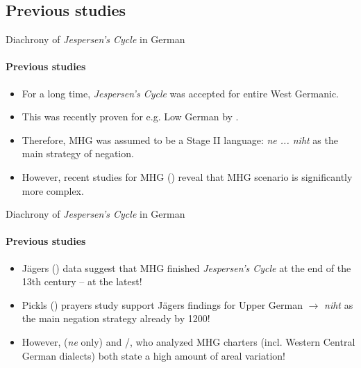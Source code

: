 \documentclass[xcolor=table, compress, %
handout
]{beamer}
\begin{document}
\subsection{Previous studies}
\begin{frame}{Diachrony of \textit{Jespersen's Cycle} in German}
\framesubtitle{Previous studies}

\begin{itemize}
    \item For a long time, \textit{Jespersen's Cycle} was accepted for entire West Germanic.
    \item This was recently proven for e.g. Low German by \citet{Breitbarth2014}.
    \item Therefore, MHG was assumed to be a Stage II language: \textit{ne ... niht} as the main strategy of negation.
    \item However, recent studies for MHG (\citealt{jaeger08,Pickl2017}) reveal that MHG scenario is significantly more complex.
\end{itemize}

\end{frame}

\begin{frame}{Diachrony of \textit{Jespersen's Cycle} in German}
\framesubtitle{Previous studies}

\begin{itemize}
    \item Jägers (\citeyear{jaeger08}) data suggest that MHG finished \textit{Jespersen's Cycle} at the end of the 13th century – at the latest!
    \item Pickls (\citeyear{Pickl2017}) prayers study support Jägers findings for Upper German $\rightarrow$ \textit{niht} as the main negation strategy already by 1200!
    \item However, \citet{witzenhausen19} (\textit{ne} only) and \citet{schueler16}/\citet{HertelimErscheinen}, who analyzed MHG charters (incl. Western Central German dialects) both state a high amount of areal variation!
\end{itemize}

\end{frame}
\end{document}
